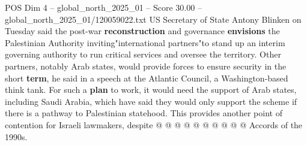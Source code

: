 \begin{textsample}{POS Dim 4 – global\_north\_2025\_01 – Score 30.00 – global\_north\_2025\_01/120059022.txt}
US Secretary of State Antony Blinken on Tuesday said the post-war \textbf{reconstruction} and governance \textbf{envisions} the Palestinian Authority inviting"international partners"to stand up an interim governing authority to run critical services and oversee the territory.
Other partners, notably Arab states, would provide forces to ensure security in the short \textbf{term}, he said in a speech at the Atlantic Council, a Washington-based think tank.
For such a \textbf{plan} to work, it would need the support of Arab states, including Saudi Arabia, which have said they would only support the scheme if there is a pathway to Palestinian statehood.
This provides another point of contention for Israeli lawmakers, despite @ @ @ @ @ @ @ @ @ @ Accords of the 1990s.

\end{textsample}
